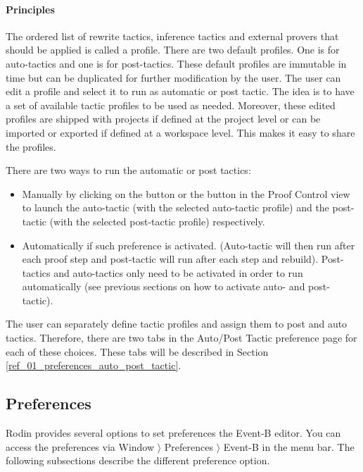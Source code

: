 \paragraph{Principles}

The ordered list of rewrite tactics, inference tactics and external provers that should be applied is called a profile. There are two default profiles. One is for auto-tactics and one is for post-tactics. These default profiles are immutable in time but can be duplicated for further modification by the user. The user can edit a profile and select it to run as automatic or post tactic. The idea is to have a set of available tactic profiles to be used as needed. Moreover, these edited profiles are shipped with projects if defined at the project level or can be imported or exported if defined at a workspace level. This makes it easy to share the profiles. 

There are two ways to run the automatic or post tactics:

\begin{itemize}
	\item Manually by clicking on the  button or the  button in the \textsf{Proof Control view} to launch the auto-tactic (with the selected auto-tactic profile) and the post-tactic (with the selected post-tactic profile) respectively.
	\item Automatically if such preference is activated. (Auto-tactic will then run after each proof step and post-tactic will run after each step and rebuild). Post-tactics and auto-tactics only need to be activated in order to run automatically (see previous sections on how to activate auto- and post-tactic). 
\end{itemize}

The user can separately define tactic profiles and assign them to post and auto tactics. Therefore, there are two tabs in the \textsf{Auto/Post Tactic} preference page for each of these choices. These tabs will be described in Section \ref{ref_01_preferences_auto_post_tactic}. 

\subsection{Preferences}
\label{preferences}

Rodin provides several options to set preferences the Event-B editor. You can access the preferences via \textsf{Window $\rangle$ Preferences $\rangle$ Event-B} in the menu bar. The following subsections describe the different preference option.

